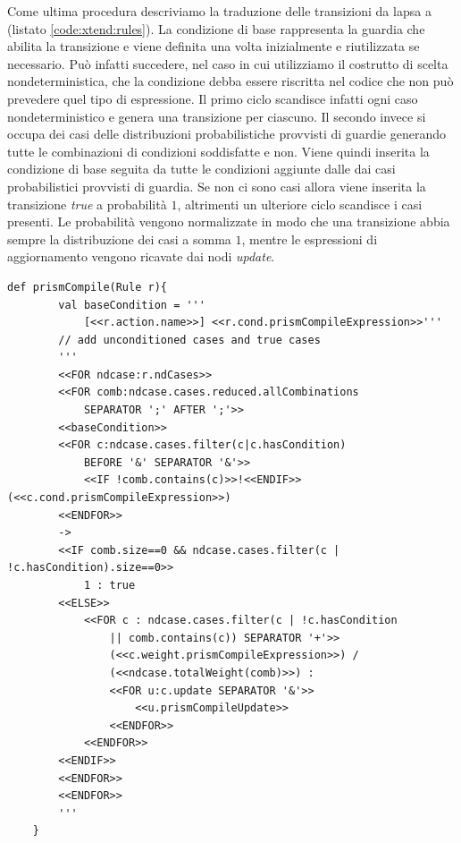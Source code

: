 Come ultima procedura descriviamo la traduzione delle transizioni da \ac{lapsa} a \prism{} (listato \ref{code:xtend:rules}). La condizione di base rappresenta la guardia che abilita la transizione e viene definita una volta inizialmente e riutilizzata se necessario. Può infatti succedere, nel caso in cui utilizziamo il costrutto di scelta nondeterministica, che la condizione debba essere riscritta nel codice \prism{} che non può prevedere quel tipo di espressione. Il primo ciclo scandisce infatti ogni caso nondeterministico e genera una transizione per ciascuno. Il secondo invece si occupa dei casi delle distribuzioni probabilistiche provvisti di guardie generando tutte le combinazioni di condizioni soddisfatte e non. Viene quindi inserita la condizione di base seguita da tutte le condizioni aggiunte dalle dai casi probabilistici provvisti di guardia. Se non ci sono casi allora viene inserita la transizione \emph{true} a probabilità $1$, altrimenti un ulteriore ciclo scandisce i casi presenti. Le probabilità vengono normalizzate in modo che una transizione abbia sempre la distribuzione dei casi a somma $1$, mentre le espressioni di aggiornamento vengono ricavate dai nodi \emph{update}.

\begin{lstlisting}[language=xtend,style=eclipse,caption={Traduzione delle transizioni da \acs{lapsa} a \prism{}},label=code:xtend:rules]
	def prismCompile(Rule r){
		val baseCondition = '''
			[<<r.action.name>>] <<r.cond.prismCompileExpression>>'''
		// add unconditioned cases and true cases
		'''
		<<FOR ndcase:r.ndCases>>
		<<FOR comb:ndcase.cases.reduced.allCombinations 
			SEPARATOR ';' AFTER ';'>>
		<<baseCondition>>
		<<FOR c:ndcase.cases.filter(c|c.hasCondition) 
			BEFORE '&' SEPARATOR '&'>>
			<<IF !comb.contains(c)>>!<<ENDIF>>(<<c.cond.prismCompileExpression>>)
		<<ENDFOR>> 
		-> 
		<<IF comb.size==0 && ndcase.cases.filter(c | !c.hasCondition).size==0>>
			1 : true
		<<ELSE>>
			<<FOR c : ndcase.cases.filter(c | !c.hasCondition 
				|| comb.contains(c)) SEPARATOR '+'>>
				(<<c.weight.prismCompileExpression>>) /
				(<<ndcase.totalWeight(comb)>>) :
				<<FOR u:c.update SEPARATOR '&'>>
					<<u.prismCompileUpdate>>
				<<ENDFOR>>
			<<ENDFOR>>
		<<ENDIF>>
		<<ENDFOR>>
		<<ENDFOR>>
		'''
	}
\end{lstlisting}

\vspace{0.4cm}